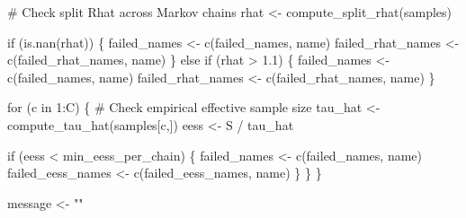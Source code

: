 \documentclass[
  letterpaper,
  DIV=11,
  numbers=noendperiod]{scrartcl}
\newenvironment{Shaded}{\begin{snugshade}}{\end{snugshade}}
\newcommand{\CommentTok}[1]{\textcolor[rgb]{0.37,0.37,0.37}{#1}}
\newcommand{\ControlFlowTok}[1]{\textcolor[rgb]{0.00,0.23,0.31}{#1}}
\newcommand{\DecValTok}[1]{\textcolor[rgb]{0.68,0.00,0.00}{#1}}
\newcommand{\FloatTok}[1]{\textcolor[rgb]{0.68,0.00,0.00}{#1}}
\newcommand{\FunctionTok}[1]{\textcolor[rgb]{0.28,0.35,0.67}{#1}}
\newcommand{\NormalTok}[1]{\textcolor[rgb]{0.00,0.23,0.31}{#1}}
\newcommand{\OtherTok}[1]{\textcolor[rgb]{0.00,0.23,0.31}{#1}}
\newcommand{\SpecialCharTok}[1]{\textcolor[rgb]{0.37,0.37,0.37}{#1}}
\newcommand{\StringTok}[1]{\textcolor[rgb]{0.13,0.47,0.30}{#1}}
\begin{document}
\begin{Shaded}
\begin{Highlighting}[]
    \CommentTok{\# Check split Rhat across Markov chains}
\NormalTok{    rhat }\OtherTok{\textless{}{-}} \FunctionTok{compute\_split\_rhat}\NormalTok{(samples)}

    \ControlFlowTok{if}\NormalTok{ (}\FunctionTok{is.nan}\NormalTok{(rhat)) \{}
\NormalTok{      failed\_names }\OtherTok{\textless{}{-}} \FunctionTok{c}\NormalTok{(failed\_names, name)}
\NormalTok{      failed\_rhat\_names }\OtherTok{\textless{}{-}} \FunctionTok{c}\NormalTok{(failed\_rhat\_names, name)}
\NormalTok{    \} }\ControlFlowTok{else} \ControlFlowTok{if}\NormalTok{ (rhat }\SpecialCharTok{\textgreater{}} \FloatTok{1.1}\NormalTok{) \{}
\NormalTok{      failed\_names }\OtherTok{\textless{}{-}} \FunctionTok{c}\NormalTok{(failed\_names, name)}
\NormalTok{      failed\_rhat\_names }\OtherTok{\textless{}{-}} \FunctionTok{c}\NormalTok{(failed\_rhat\_names, name)}
\NormalTok{    \}}

    \ControlFlowTok{for}\NormalTok{ (c }\ControlFlowTok{in} \DecValTok{1}\SpecialCharTok{:}\NormalTok{C) \{}
      \CommentTok{\# Check empirical effective sample size}
\NormalTok{      tau\_hat }\OtherTok{\textless{}{-}} \FunctionTok{compute\_tau\_hat}\NormalTok{(samples[c,])}
\NormalTok{      eess }\OtherTok{\textless{}{-}}\NormalTok{ S }\SpecialCharTok{/}\NormalTok{ tau\_hat}
      
      \ControlFlowTok{if}\NormalTok{ (eess }\SpecialCharTok{\textless{}}\NormalTok{ min\_eess\_per\_chain) \{}
\NormalTok{        failed\_names }\OtherTok{\textless{}{-}} \FunctionTok{c}\NormalTok{(failed\_names, name)}
\NormalTok{        failed\_eess\_names }\OtherTok{\textless{}{-}} \FunctionTok{c}\NormalTok{(failed\_eess\_names, name)}
\NormalTok{      \}}
\NormalTok{    \}}
\NormalTok{  \}}
  
\NormalTok{  message }\OtherTok{\textless{}{-}} \StringTok{""}
  

\end{Highlighting}
\end{Shaded}
\end{document}

